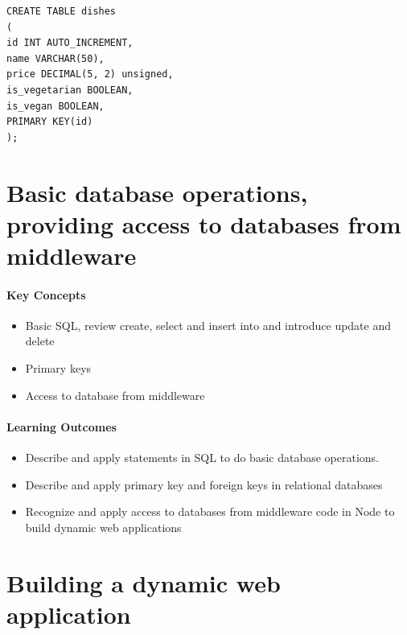 \begin{verbatim}
CREATE TABLE dishes
(
id INT AUTO_INCREMENT,
name VARCHAR(50),
price DECIMAL(5, 2) unsigned,
is_vegetarian BOOLEAN,
is_vegan BOOLEAN,
PRIMARY KEY(id)
);
\end{verbatim}


\section{Basic database operations, providing access to databases from middleware}

\begin{mdframed}

\paragraph{Key Concepts}
\begin{itemize}[label={\checkmark}]
\item Basic SQL, review create, select and insert into and introduce update and delete
\item Primary keys
\item Access to database from middleware

\end{itemize}

\paragraph{Learning Outcomes}
\begin{itemize}[label={\checkmark}]
\item Describe and apply statements in SQL to do basic database operations. 
\item Describe and apply primary key and foreign keys in relational databases
\item Recognize and apply access to databases from middleware code in Node to build dynamic web applications

\end{itemize}
\end{mdframed}


\section{Building a dynamic web application}

